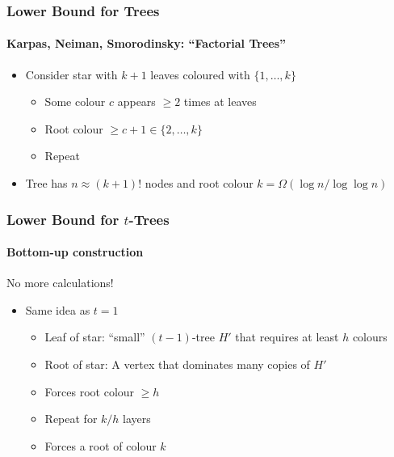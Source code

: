 \documentclass[xcolor=dvipsnames]{beamer}
\begin{document}
\begin{frame}
  \frametitle{Lower Bound for Trees}
  \framesubtitle{Karpas, Neiman, Smorodinsky: ``Factorial Trees''}

  \begin{itemize}
    \item Consider star with $k+1$ leaves coloured with $\{1,\ldots,k\}$
    \begin{itemize}
      \item<2-> Some colour $c$ appears $\ge\!\! 2$ times at leaves
      \item<4-> Root colour $\ge\!\!c+1 \in \{2,\ldots,k\}$
      \item<6-> Repeat
    \end{itemize}
    \item <8-> Tree has $n\approx(k+1)!$ nodes and root colour $k=\Omega(\log n/\log\log n)$
  \end{itemize}
    \begin{center}
    \end{center}
\end{frame}

\begin{frame}
  \frametitle{Lower Bound for $t$-Trees}
  \framesubtitle{Bottom-up construction}

  \alert{No more calculations!}

  \begin{itemize}
    \item Same idea as $t=1$
    \begin{itemize}
      \item<1-> Leaf of star: ``small'' $(t-1)$-tree $H'$ that requires at least $h$ colours
      \item<3-> Root of star: A vertex that dominates many copies of $H'$
      \item<5-> Forces root colour $\ge h$
      \item<6-> Repeat for $k/h$ layers
      \item<7-> Forces a root of colour $k$
    \end{itemize}
    \begin{center}
    \end{center}
  \end{itemize}
\end{frame}
\end{document}
